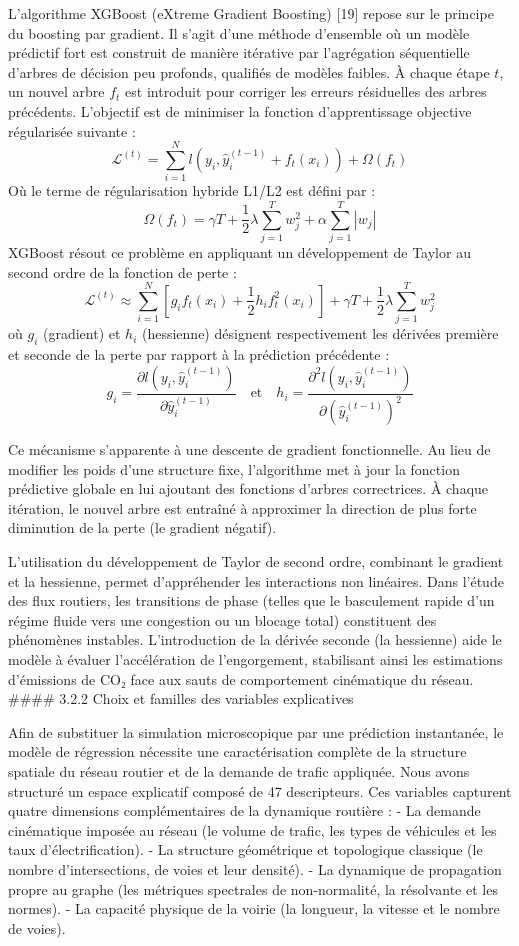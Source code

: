 \documentclass[10pt, a4paper]{article}
\begin{document}
L'algorithme XGBoost (eXtreme Gradient Boosting) {[}19{]} repose sur le
principe du boosting par gradient. Il s'agit d'une méthode d'ensemble où
un modèle prédictif fort est construit de manière itérative par
l'agrégation séquentielle d'arbres de décision peu profonds, qualifiés
de modèles faibles. À chaque étape \(t\), un nouvel arbre \(f_t\) est
introduit pour corriger les erreurs résiduelles des arbres précédents.
L'objectif est de minimiser la fonction d'apprentissage objective
régularisée suivante :
\[\mathcal{L}^{(t)} = \sum_{i=1}^N l\left(y_i, \hat{y}_i^{(t-1)} + f_t(x_i)\right) + \Omega(f_t)\]
Où le terme de régularisation hybride L1/L2 est défini par :
\[\Omega(f_t) = \gamma T + \frac{1}{2} \lambda \sum_{j=1}^T w_j^2 + \alpha \sum_{j=1}^T |w_j|\]
XGBoost résout ce problème en appliquant un développement de Taylor au
second ordre de la fonction de perte :
\[\mathcal{L}^{(t)} \approx \sum_{i=1}^N \left[ g_i f_t(x_i) + \frac{1}{2} h_i f_t^2(x_i) \right] + \gamma T + \frac{1}{2} \lambda \sum_{j=1}^T w_j^2\]
où \(g_i\) (gradient) et \(h_i\) (hessienne) désignent respectivement
les dérivées première et seconde de la perte par rapport à la prédiction
précédente :
\[g_i = \frac{\partial l\left(y_i, \hat{y}_i^{(t-1)}\right)}{\partial \hat{y}_i^{(t-1)}} \quad \text{et} \quad h_i = \frac{\partial^2 l\left(y_i, \hat{y}_i^{(t-1)}\right)}{\partial \left(\hat{y}_i^{(t-1)}\right)^2}\]

Ce mécanisme s'apparente à une descente de gradient fonctionnelle. Au
lieu de modifier les poids d'une structure fixe, l'algorithme met à jour
la fonction prédictive globale en lui ajoutant des fonctions d'arbres
correctrices. À chaque itération, le nouvel arbre est entraîné à
approximer la direction de plus forte diminution de la perte (le
gradient négatif).

L'utilisation du développement de Taylor de second ordre, combinant le
gradient et la hessienne, permet d'appréhender les interactions non
linéaires. Dans l'étude des flux routiers, les transitions de phase
(telles que le basculement rapide d'un régime fluide vers une congestion
ou un blocage total) constituent des phénomènes instables.
L'introduction de la dérivée seconde (la hessienne) aide le modèle à
évaluer l'accélération de l'engorgement, stabilisant ainsi les
estimations d'émissions de CO₂ face aux sauts de comportement
cinématique du réseau. \#\#\#\# 3.2.2 Choix et familles des variables
explicatives

Afin de substituer la simulation microscopique par une prédiction
instantanée, le modèle de régression nécessite une caractérisation
complète de la structure spatiale du réseau routier et de la demande de
trafic appliquée. Nous avons structuré un espace explicatif composé de
47 descripteurs. Ces variables capturent quatre dimensions
complémentaires de la dynamique routière : - La demande cinématique
imposée au réseau (le volume de trafic, les types de véhicules et les
taux d'électrification). - La structure géométrique et topologique
classique (le nombre d'intersections, de voies et leur densité). - La
dynamique de propagation propre au graphe (les métriques spectrales de
non-normalité, la résolvante et les normes). - La capacité physique de
la voirie (la longueur, la vitesse et le nombre de voies).
\end{document}

